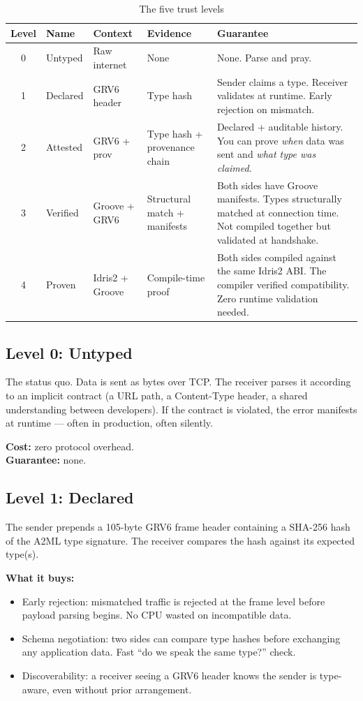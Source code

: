 \documentclass[11pt,a4paper]{article}
\begin{document}
\begin{table}[h]
\centering
\small
\begin{tabular}{clllp{4cm}}
\toprule
Level & Name & Context & Evidence & Guarantee \\
\midrule
0 & Untyped & Raw internet & None & None. Parse and pray. \\
1 & Declared & GRV6 header & Type hash & Sender claims a type. Receiver validates at runtime. Early rejection on mismatch. \\
2 & Attested & GRV6 + prov & Type hash + provenance chain & Declared + auditable history. You can prove \emph{when} data was sent and \emph{what type was claimed}. \\
3 & Verified & Groove + GRV6 & Structural match + manifests & Both sides have Groove manifests. Types structurally matched at connection time. Not compiled together but validated at handshake. \\
4 & Proven & Idris2 + Groove & Compile-time proof & Both sides compiled against the same Idris2 ABI. The compiler verified compatibility. Zero runtime validation needed. \\
\bottomrule
\end{tabular}
\caption{The five trust levels}
\label{tab:levels}
\end{table}

\subsection{Level 0: Untyped}

The status quo. Data is sent as bytes over TCP. The receiver parses it
according to an implicit contract (a URL path, a Content-Type header, a
shared understanding between developers). If the contract is violated,
the error manifests at runtime --- often in production, often silently.

\textbf{Cost:} zero protocol overhead.\\
\textbf{Guarantee:} none.

\subsection{Level 1: Declared}

The sender prepends a 105-byte GRV6 frame header containing a SHA-256
hash of the A2ML type signature. The receiver compares the hash against
its expected type(s).

\textbf{What it buys:}
\begin{itemize}
\item Early rejection: mismatched traffic is rejected at the frame level
  before payload parsing begins. No CPU wasted on incompatible data.
\item Schema negotiation: two sides can compare type hashes before
  exchanging any application data. Fast ``do we speak the same type?''
  check.
\item Discoverability: a receiver seeing a GRV6 header knows the sender
  is type-aware, even without prior arrangement.
\end{itemize}
\end{document}
